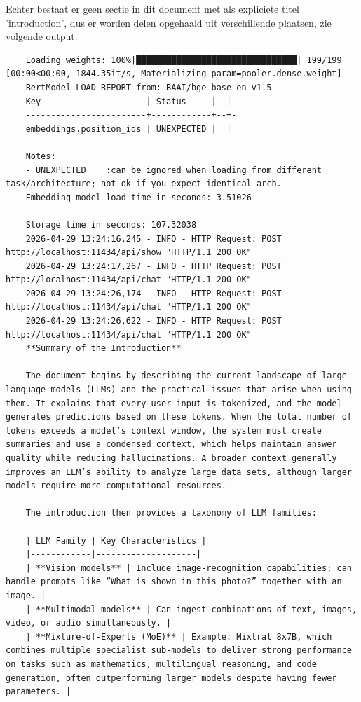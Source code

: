Echter bestaat er geen sectie in dit document met als expliciete titel 'introduction', dus er worden delen opgehaald uit verschillende plaatsen, zie volgende output: \\

\begin{verbatim}
    Loading weights: 100%|████████████████████████████████| 199/199 [00:00<00:00, 1844.35it/s, Materializing param=pooler.dense.weight]
    BertModel LOAD REPORT from: BAAI/bge-base-en-v1.5
    Key                     | Status     |  | 
    ------------------------+------------+--+-
    embeddings.position_ids | UNEXPECTED |  | 
    
    Notes:
    - UNEXPECTED    :can be ignored when loading from different task/architecture; not ok if you expect identical arch.
    Embedding model load time in seconds: 3.51026 
    
    Storage time in seconds: 107.32038 
    2026-04-29 13:24:16,245 - INFO - HTTP Request: POST http://localhost:11434/api/show "HTTP/1.1 200 OK"
    2026-04-29 13:24:17,267 - INFO - HTTP Request: POST http://localhost:11434/api/chat "HTTP/1.1 200 OK"
    2026-04-29 13:24:26,174 - INFO - HTTP Request: POST http://localhost:11434/api/chat "HTTP/1.1 200 OK"
    2026-04-29 13:24:26,622 - INFO - HTTP Request: POST http://localhost:11434/api/chat "HTTP/1.1 200 OK"
    **Summary of the Introduction**
    
    The document begins by describing the current landscape of large language models (LLMs) and the practical issues that arise when using them. It explains that every user input is tokenized, and the model generates predictions based on these tokens. When the total number of tokens exceeds a model’s context window, the system must create summaries and use a condensed context, which helps maintain answer quality while reducing hallucinations. A broader context generally improves an LLM’s ability to analyze large data sets, although larger models require more computational resources.
    
    The introduction then provides a taxonomy of LLM families:
    
    | LLM Family | Key Characteristics |
    |------------|--------------------|
    | **Vision models** | Include image‑recognition capabilities; can handle prompts like “What is shown in this photo?” together with an image. |
    | **Multimodal models** | Can ingest combinations of text, images, video, or audio simultaneously. |
    | **Mixture‑of‑Experts (MoE)** | Example: Mixtral 8x7B, which combines multiple specialist sub‑models to deliver strong performance on tasks such as mathematics, multilingual reasoning, and code generation, often outperforming larger models despite having fewer parameters. |
    

\end{verbatim}
